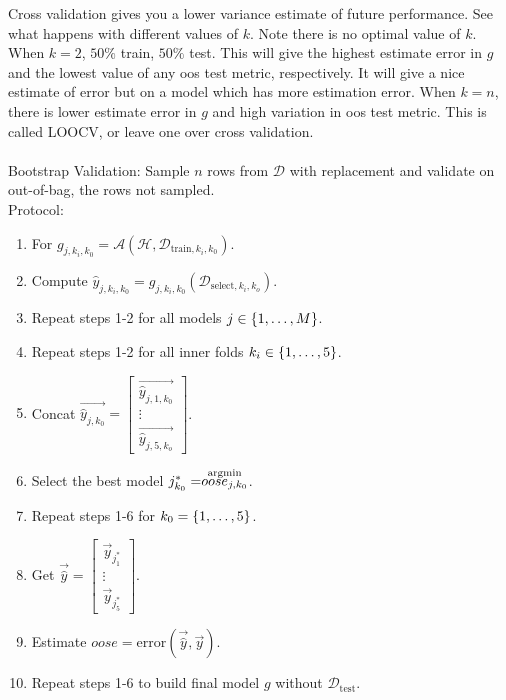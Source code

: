\documentclass[12pt]{article}
\begin{document}
Cross validation gives you a lower variance estimate of future performance. See what happens with different values of $k$. Note there is no optimal value of $k$. \\
When $k=2$, $50\%$ train, $50\%$ test. This will give the highest estimate error in $g$ and the lowest value of any oos test metric, respectively. It will give a nice estimate of error but on a model which has more estimation error. 
When $k=n$, there is lower estimate error in $g$ and high variation in oos test metric. This is called LOOCV, or leave one over cross validation. \\~\\
Bootstrap Validation: Sample $n$ rows from $\mathcal{D}$ with replacement and validate on out-of-bag, the rows not sampled. \\
Protocol: \begin{enumerate} 
\item For $g_{j, k_i, k_0} = \mathcal{A}(\mathcal{H}, \mathcal{D}_{\text{train}, k_i, k_0})$.
\item Compute $\hat{y}_{j, k_i, k_0} = g_{j, k_i, k_0}(\mathcal{D}_{\text{select}, k_i, k_o})$.
\item Repeat steps 1-2 for all models $j \in \left\{ 1,\dots,M \right\}$.
\item Repeat steps 1-2 for all inner folds $k_i \in \left\{ 1,\dots,5 \right\}$.
\item Concat $\vec{\hat{y}_{j, k_0}} = \begin{bmatrix} \vec{\hat{y}_{j, 1, k_0}} \\ \vdots \\ \vec{\hat{y}_{j, 5, k_o}} \end{bmatrix}$. 
\item Select the best model $j^*_{k_0} = \stackrel{\text{argmin}}{oose_{j, k_0}}$. 
\item Repeat steps 1-6 for $k_0 = \left\{ 1,\dots, 5 \right\}$. 
\item Get $\vec{\hat{y}} = \begin{bmatrix} \vec{y}_{j^*_1} \\ \vdots \\ \vec{y}_{j^*_5} \end{bmatrix} $. 
\item Estimate $oose = \text{error}(\vec{\hat{y}}, \vec{y})$. 
\item Repeat steps 1-6 to build final model $g$ without $\mathcal{D}_{\text{test}}$. \end{enumerate}
\end{document}
